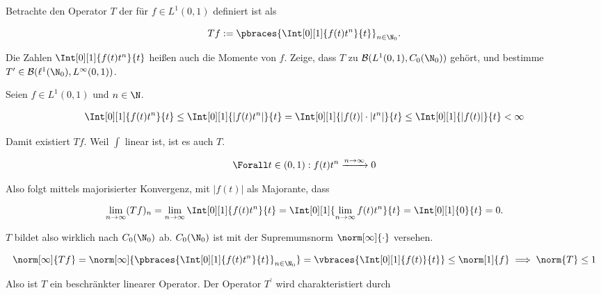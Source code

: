 \begin{exercise}[18/1]

Betrachte den Operator $T$ der für $f \in L^1(0, 1)$ definiert ist als

\begin{align*}
  T f
  :=
  \pbraces{\Int[0][1]{f(t) t^n}{t}}_{n \in \N_0}.
\end{align*}

Die Zahlen $\Int[0][1]{f(t) t^n}{t}$ heißen auch die Momente von $f$.
Zeige, dass $T$ zu $\mathcal{B}(L^1(0, 1), C_0(\N_0))$ gehört, und bestimme $T^\prime \in \mathcal{B}(\ell^1(\N_0), L^\infty(0, 1))$.

\end{exercise}

\begin{solution}

Seien $f \in L^1(0, 1)$ und $ n \in \N$.

\begin{align*}
  \Int[0][1]{f(t)t^n}{t}
  \leq
  \Int[0][1]{|f(t) t^n|}{t}
  =
  \Int[0][1]{|f(t)| \cdot |t^n|}{t}
  \leq
  \Int[0][1]{|f(t)|}{t} < \infty
\end{align*}

Damit existiert $Tf$.
Weil $\int$ linear ist, ist es auch $T$.

\begin{align*}
  \Forall t \in (0, 1):
  f(t) t^n
  \xrightarrow{n \to \infty} 0
\end{align*}

Also folgt mittels majorisierter Konvergenz, mit $|f(t)|$ als Majorante, dass

\begin{align*}
  \lim_{n \to \infty}
  (T f)_n
  =
  \lim_{n \to \infty}
  \Int[0][1]{f(t) t^n}{t}
  =
  \Int[0][1]{\lim_{n \to \infty} f(t) t^n}{t}
  =
  \Int[0][1]{0}{t} = 0.
\end{align*}

$T$ bildet also wirklich nach $C_0(\N_0)$ ab.
$C_0(\N_0)$ ist mit der Supremumsnorm $\norm[\infty]{\cdot}$ versehen.

\begin{align*}
  \norm[\infty]{T f}
  =
  \norm[\infty]
  {\pbraces{\Int[0][1]{f(t) t^n}{t}}_{n \in \N_0}}
  =
  \vbraces{\Int[0][1]{f(t)}{t}}
  \leq
  \norm[1]{f}
  \implies
  \norm{T} \leq 1
\end{align*}

Also ist $T$ ein beschränkter linearer Operator.
Der Operator $T^\prime$ wird charakteristiert durch


\end{solution}
